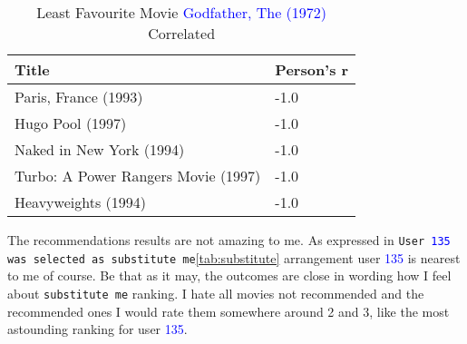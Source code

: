\begin{table}[h!]
\centering
\begin{tabular}{| l | l |}
\hline
Title & Person's r \\
\hline
Paris, France (1993) & -1.0 \\
 Hugo Pool (1997) & -1.0 \\
 Naked in New York (1994) & -1.0 \\
 Turbo: A Power Rangers Movie (1997) & -1.0 \\
 Heavyweights (1994) & -1.0\\
\hline
\end{tabular}
\caption{Least Favourite Movie \textcolor{blue}{Godfather, The (1972)} Correlated}
\label{tab:nfav}
\end{table}

The recommendations results are not amazing to me. As expressed in {\tt User \textcolor{blue}{135} was selected as substitute me}\ref{tab:substitute} arrangement user \textcolor{blue}{135} is nearest to me of course. Be that as it may, the outcomes are close in wording how I feel about {\tt substitute me} ranking. I hate all movies not recommended and the recommended ones I would rate them somewhere around 2 and 3, like the most astounding ranking for user \textcolor{blue}{135}.